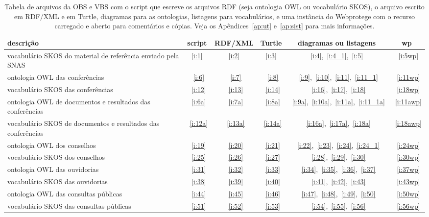 \documentclass[12pt]{article}
\begin{document}
\begin{table}[htpq!]
\vspace{-1cm}
\centering
\caption{Tabela de arquivos da OBS e VBS com o script que escreve os arquivos RDF (seja ontologia OWL ou vocabulário SKOS), o arquivo escrito em RDF/XML e em Turtle, diagramas para as ontologias, listagens para vocabulários, e uma instância do Webprotege com o recurso carregado e aberto para comentários e cópias. Veja os Apêndices~\ref{ap:ut} e~\ref{ap:sist} para mais informações.}
\begin{tabular}{| p{} | c | c | c | c | c | }\hline
 {\bf descrição} & {\bf script} & {\bf RDF/XML} & {\bf Turtle} & {\bf diagramas ou listagens} & {\bf wp} \\\hline\hline
vocabulário SKOS do material de referência enviado pela SNAS  & \ref{i:1} & \ref{i:2} & \ref{i:3} & \ref{i:4},~\ref{i:4_1},~\ref{i:5} &~\ref{i:5wp} \\\hline\hline
ontologia OWL das conferências &~\ref{i:6}&~\ref{i:7}&~\ref{i:8}&~\ref{i:9},~\ref{i:10},~\ref{i:11},~\ref{i:11_1}&~\ref{i:11wp} \\
vocabulário SKOS das conferências &~\ref{i:12}&~\ref{i:13}&~\ref{i:14}&~\ref{i:16},~\ref{i:17},~\ref{i:18}&~\ref{i:18wp} \\\hline\hline

ontologia OWL  de documentos e resultados das conferências &~\ref{i:6a}&~\ref{i:7a}&~\ref{i:8a}&~\ref{i:9a},~\ref{i:10a},~\ref{i:11a},~\ref{i:11_1a}&~\ref{i:11awp} \\
vocabulário SKOS de documentos e resultados das conferências &~\ref{i:12a}&~\ref{i:13a}&~\ref{i:14a}&~\ref{i:16a},~\ref{i:17a},~\ref{i:18a}&~\ref{i:18awp} \\\hline\hline

ontologia OWL dos conselhos &~\ref{i:19}&~\ref{i:20}&~\ref{i:21}&~\ref{i:22},~\ref{i:23},~\ref{i:24},~\ref{i:24_1}&~\ref{i:24wp} \\
vocabulário SKOS dos conselhos &~\ref{i:25}&~\ref{i:26}&~\ref{i:27}&~\ref{i:28},~\ref{i:29},~\ref{i:30}&~\ref{i:30wp} \\\hline\hline

ontologia   OWL das  ouvidorias &~\ref{i:31}&~\ref{i:32}&~\ref{i:33}&~\ref{i:34},~\ref{i:35},~\ref{i:36},~\ref{i:37}&~\ref{i:37wp} \\
vocabulário SKOS das ouvidorias &~\ref{i:38}&~\ref{i:39}&~\ref{i:40}&~\ref{i:41},~\ref{i:42},~\ref{i:43}&~\ref{i:43wp} \\\hline\hline

ontologia   OWL  das consultas públicas &~\ref{i:44}&~\ref{i:45}&~\ref{i:46}&~\ref{i:47},~\ref{i:48},~\ref{i:49},~\ref{i:50}&~\ref{i:50wp} \\
vocabulário SKOS das consultas públicas &~\ref{i:51}&~\ref{i:52}&~\ref{i:53}&~\ref{i:54},~\ref{i:55},~\ref{i:56}&~\ref{i:56wp} \\\hline\hline


\end{tabular}
\end{table}
\end{document}
